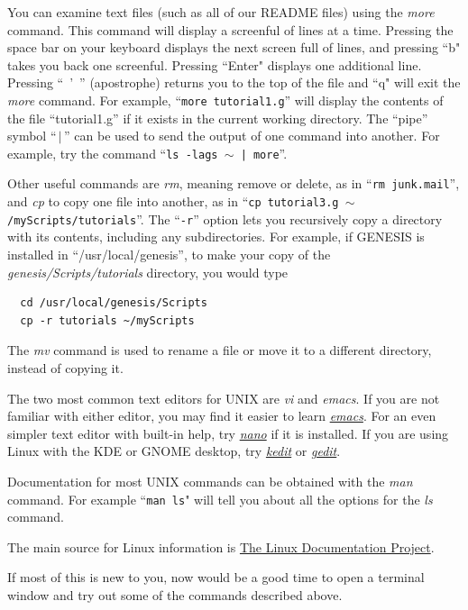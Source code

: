 \documentclass[12pt]{article}
\begin{document}
You can examine text files (such as all of our README files) using the {\it more} command. This command will display a screenful of lines at a time. Pressing the space bar on your keyboard displays the next screen full of lines, and pressing ``b" takes you back one screenful. Pressing ``Enter" displays one additional line. Pressing ``\ '\ '' (apostrophe) returns you to the top of the file and ``q" will exit the {\it more} command. For example, ``{\tt more tutorial1.g}'' will display the contents of the file ``tutorial1.g'' if it exists in the current working directory. The ``pipe'' symbol ``\,$|$\,'' can be used to send the output of one command into another. For example, try the command ``{\tt ls -lags $\sim$ | more}''.

Other useful commands are {\it rm}, meaning remove or delete, as in ``{\tt rm junk.mail}'', and {\it cp} to copy one file into another, as in ``{\tt cp tutorial3.g $\sim$/myScripts/tutorials}''. The ``{\tt -r}'' option lets you recursively copy a directory with its contents, including any subdirectories. For example, if GENESIS is installed in ``/usr/local/genesis'', to make your copy of the {\it genesis/Scripts/tutorials} directory, you would type
\begin{verbatim}
  cd /usr/local/genesis/Scripts
  cp -r tutorials ~/myScripts
 \end{verbatim}
The {\it mv} command is used to rename a file or move it to a different directory, instead of copying it.

The two most common text editors for UNIX are {\it vi} and {\it emacs}. If you are not familiar with either editor, you may find it easier to learn \href{http://www.gnu.org/software/emacs/tour/}{\it emacs}. For an even simpler text editor with built-in help, try \href{http://www.nano-editor.org/}{\it nano} if it is installed. If you are using Linux with the KDE or GNOME desktop, try \href{http://webcvs.kde.org/kdeutils/kedit/}{\it kedit} or \href{http://projects.gnome.org/gedit/}{\it gedit}.

Documentation for most UNIX commands can be obtained with the {\it man} command. For example ``{\tt man ls}" will tell you about all the options for the {\it ls} command.

The main source for Linux information is \href{http://www.tldp.org/ }{The Linux Documentation Project}.

If most of this is new to you, now would be a good time to open a terminal window and try out some of the commands described above.
\end{document}
